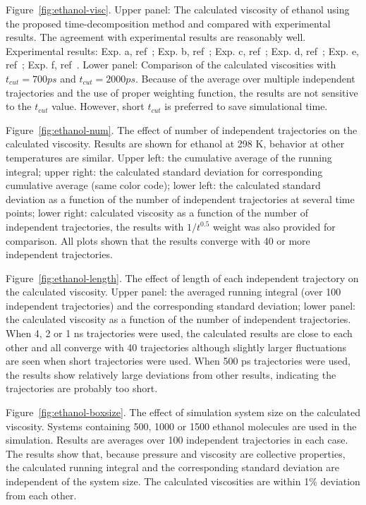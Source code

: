 \documentclass[12pt]{article}
\begin{document}
Figure~\ref{fig:ethanol-visc}.
Upper panel: The calculated viscosity of ethanol using the proposed time-decomposition method
and compared with experimental results.
The agreement with experimental results are reasonably well.
Experimental results: 
Exp. a, ref~\cite{Jouyban.KJCE.29.812.2012};
Exp. b, ref~\cite{Nain.JML.140.108.2008};
Exp. c, ref~\cite{Bhuiyan.JML.138.139.2008};
Exp. d, ref~\cite{Fonseca.JCED.52.1240.2007};
Exp. e, ref~\cite{Taboas.JCED.51.940.2006};
Exp. f, ref~\cite{Tojo.JCED.49.1590.2004}.
Lower panel: Comparison of the calculated viscosities with $t_{cut}=700 ps$ and $t_{cut}=2000 ps$.
Because of the average over multiple independent trajectories and the use of proper weighting function,
the results are not sensitive to the $t_{cut}$ value.
However, short $t_{cut}$ is preferred to save simulational time. 


Figure~\ref{fig:ethanol-num}.
The effect of number of independent trajectories on the calculated viscosity.
Results are shown for ethanol at 298 K, behavior at other temperatures are similar.
Upper left: the cumulative average of the running integral;
upper right: the calculated standard deviation for corresponding cumulative average (same color code);
lower left: the calculated standard deviation as a function of the number of independent trajectories at several time points;
lower right: calculated viscosity as a function of the number of independent trajectories,
the results with $1/t^{0.5}$ weight was also provided for comparison.
All plots shown that the results  converge with 40 or more independent trajectories.


Figure~\ref{fig:ethanol-length}.
The effect of length of each independent trajectory on the calculated viscosity.
Upper panel: the averaged running integral (over 100 independent trajectories) and the corresponding standard deviation;
lower panel: the calculated viscosity as a function of the number of independent trajectories.
When 4, 2 or 1 ns trajectories were used,
the calculated results are close to each other
and all converge with 40 trajectories although slightly larger fluctuations are seen when short trajectories were used.
When 500 ps trajectories were used,
the results show relatively large deviations from other results,
indicating the trajectories are probably too short.

Figure~\ref{fig:ethanol-boxsize}.
The effect of simulation system size on the calculated viscosity.
Systems containing 500, 1000 or 1500 ethanol molecules are used in the simulation.
Results are averages over 100 independent trajectories in each case.
The results show that,
because pressure and viscosity are collective properties,
the calculated running integral and the corresponding standard deviation are independent of the system size.
The calculated viscosities are within 1\% deviation from each other.
\end{document}
